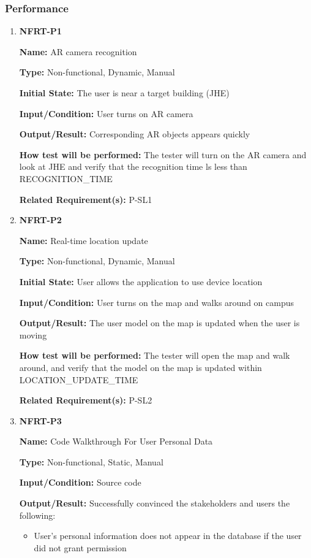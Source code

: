 \documentclass[12pt, titlepage]{article}
\begin{document}
\subsubsection{Performance}

\begin{enumerate}
\item{\textbf{NFRT-P1}}

\textbf{Name:} AR camera recognition

\textbf{Type:} Non-functional, Dynamic, Manual
					
\textbf{Initial State:} The user is near a target building (JHE)
					
\textbf{Input/Condition:} User turns on AR camera
					
\textbf{Output/Result:} Corresponding AR objects appears quickly

\textbf{How test will be performed:} The tester will turn on the AR camera and look at JHE and verify that the recognition time ls less than RECOGNITION\_TIME

\textbf{Related Requirement(s):} P-SL1

\item{\textbf{NFRT-P2}}

\textbf{Name:} Real-time location update

\textbf{Type:} Non-functional, Dynamic, Manual
					
\textbf{Initial State:} User allows the application to use device location
					
\textbf{Input/Condition:} User turns on the map and walks around on campus
					
\textbf{Output/Result:} The user model on the map is updated when the user is moving

\textbf{How test will be performed:} The tester will open the map and walk around, and verify that the model on the map is updated within LOCATION\_UPDATE\_TIME

\textbf{Related Requirement(s):} P-SL2

\item{\textbf{NFRT-P3}}

\textbf{Name:} Code Walkthrough For User Personal Data

\textbf{Type:} Non-functional, Static, Manual

\textbf{Input/Condition:} Source code

\textbf{Output/Result:} Successfully convinced the stakeholders and users the following:
\begin{itemize}
  \item User's personal information does not appear in the database if the user did not grant permission
\end{itemize}


\end{enumerate}
\end{document}
